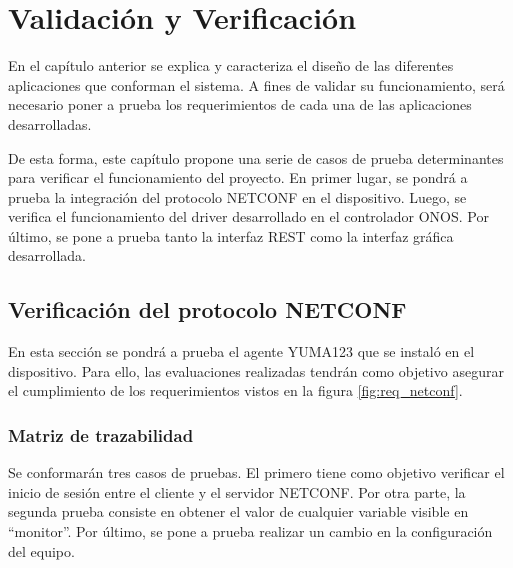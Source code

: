 
\chapter{Validación y Verificación} %
\label{Chapter5} %


En el capítulo anterior se explica y caracteriza el diseño de las diferentes aplicaciones que conforman el sistema. A fines de validar su funcionamiento, será necesario poner a prueba los requerimientos de cada una de las aplicaciones desarrolladas. 

De esta forma, este capítulo propone una serie de casos de prueba determinantes para verificar el funcionamiento del proyecto. En primer lugar, se pondrá a prueba la integración del protocolo NETCONF en el dispositivo. Luego, se verifica el funcionamiento del driver desarrollado en el controlador ONOS. Por último, se pone a prueba tanto la interfaz REST como la interfaz gráfica desarrollada.


\section{Verificación del protocolo NETCONF}

En esta sección se pondrá a prueba el agente YUMA123 que se instaló en el dispositivo. Para ello, las evaluaciones realizadas tendrán como objetivo asegurar el cumplimiento de los requerimientos vistos en la figura \ref{fig:req_netconf}.

\subsection{Matriz de trazabilidad}

Se conformarán tres casos de pruebas. El primero tiene como objetivo verificar el inicio de sesión entre el cliente y el servidor NETCONF. Por otra parte, la segunda prueba consiste en obtener el valor de cualquier variable visible en “monitor”. Por último, se pone a prueba realizar un cambio en la configuración del equipo.

